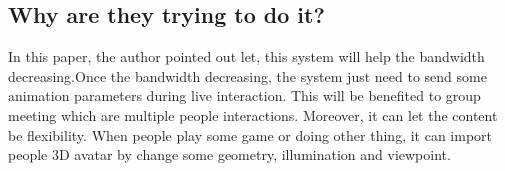 \documentclass[12pt,a4paper,titlepage]{article}
\begin{document}
{\subsection{Why are they trying to do it?}{
In this paper, the author pointed out let, this system will help the bandwidth decreasing.Once the bandwidth decreasing, the system just need to send some animation parameters during
live interaction. This will be benefited to group meeting which are multiple people interactions.\newline
Moreover, it can let the content be flexibility. When people play some game or doing other thing, it can import people 3D avatar by change some geometry, illumination and viewpoint.
}
}
\end{document}
